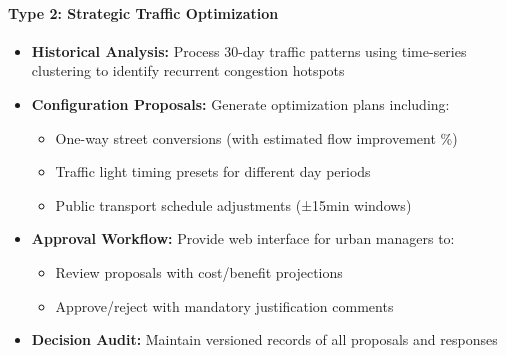 \documentclass[11.5pt]{article}
\begin{document}
    \paragraph{Type 2: Strategic Traffic Optimization}
    \begin{itemize}
        \item \textbf{Historical Analysis:} Process 30-day traffic patterns using time-series clustering to identify recurrent congestion hotspots
        \item \textbf{Configuration Proposals:} Generate optimization plans including:
        \begin{itemize}
            \item One-way street conversions (with estimated flow improvement \%)
            \item Traffic light timing presets for different day periods
            \item Public transport schedule adjustments (±15min windows)
        \end{itemize}
        \item \textbf{Approval Workflow:} Provide web interface for urban managers to:
        \begin{itemize}
            \item Review proposals with cost/benefit projections
            \item Approve/reject with mandatory justification comments
        \end{itemize}
        \item \textbf{Decision Audit:} Maintain versioned records of all proposals and responses
    \end{itemize}
    
\end{document}
